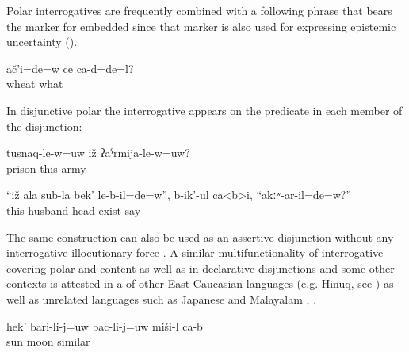 Polar interrogatives are frequently combined with a following phrase that bears the marker for embedded   since that marker is also used for expressing epistemic uncertainty ().
%
\begin{exe}
	\ex	\label{ex:Was it wheat or something else}
	\gll	ač'i=de=w	ce	ca-d=de=l?\\
		wheat	what	\\
	\glt	{}
\end{exe}

In disjunctive polar  the interrogative  appears on the predicate in each member of the disjunction:
%
\begin{exe}
	\ex	\label{ex:Is he in a prison or in the army}
	\gll	tusnaq-le-w=uw	iž	ʡaˁrmija-le-w=uw?\\
		prison	this	army\\
	\glt	{}

	\ex	\label{ex:‎They say to the wife, Did your husband have a head or not}
	\gll	``iž	ala	sub-la	bek'	le-b-il=de=w'',	b-ik'-ul	ca<b>i,	``akːʷ-ar-il=de=w?''	\\
		this		husband	head	exist	say		\\
	\glt	{}
\end{exe}

The same construction can also be used as an assertive disjunction without any interrogative illocutionary force . A similar multifunctionality of interrogative  covering polar and content  as well as in declarative disjunctions and some other contexts is attested in a  of other East Caucasian languages (e.g. Hinuq, see ) as well as unrelated languages such as Japanese and Malayalam \citep[2]{Slade2011}, \citep{Uegaki2018}. 
%
\begin{exe}
	\ex	\label{ex:This is similar to the sun or the moon}
	\gll	hek'	bari-li-j=uw	bac-li-j=uw	miši-l	ca-b\\
			sun	moon	similar	\\
	\glt	{}
\end{exe}


